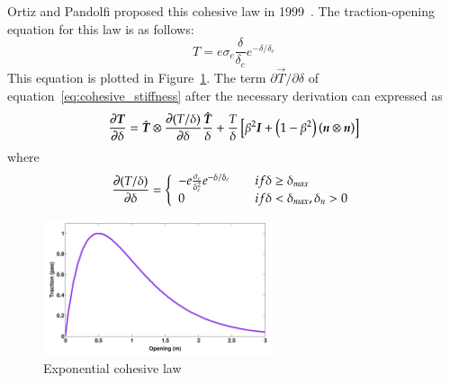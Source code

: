 Ortiz and Pandolfi proposed this cohesive law in 1999~\cite{ortiz1999}.  The
traction-opening equation for this law is as follows:
\begin{equation}
  \label{eq:exponential_law}
  T = e \sigma_c \frac{\delta}{\delta_c}e^{-\delta/ \delta_c}
\end{equation}
This equation is plotted in Figure~\ref{fig:smm:CL:ECL}. The term
$\partial{\vec{T}}/ \partial{\delta}$ of
equation~\eqref{eq:cohesive_stiffness} after the necessary derivation
can expressed as
\begin{equation}
  \label{eq:tangent_cohesive}
  \frac{\partial{\ensuremath{\boldsymbol{T}}}} {\partial{\delta}} = \hat{\boldsymbol{T}} \otimes
  \frac                       {\partial{(T/\delta)}}{\partial{\delta}}
  \frac{\hat{\boldsymbol{T}}}{\delta}+ \frac{T}{\delta}  \left[ \beta^2 \boldsymbol{I} +
  \left(1-\beta^2\right) \left(\boldsymbol{n} \otimes \boldsymbol{n}\right)\right]
\end{equation}
where
\begin{equation}
  \frac{\partial{(T/ \delta)}}{\partial{\delta}} = \left\{\begin{array} {l l}
      -e  \frac{\sigma_c}{\delta_c^2  }e^{-\delta  /  \delta_c} &  \quad  if
      \delta \geq \delta_{max}\\
      0 & \quad if \delta < \delta_{max}, \delta_n > 0
    \end{array} \right.
\end{equation}


\begin{figure}[!htb]
  \begin{center}
    \includegraphics[width=0.6\textwidth,keepaspectratio=true]{figures/cohesive_exponential.pdf}
    \caption{Exponential cohesive law}
    \label{fig:smm:CL:ECL}
  \end{center}
\end{figure}


